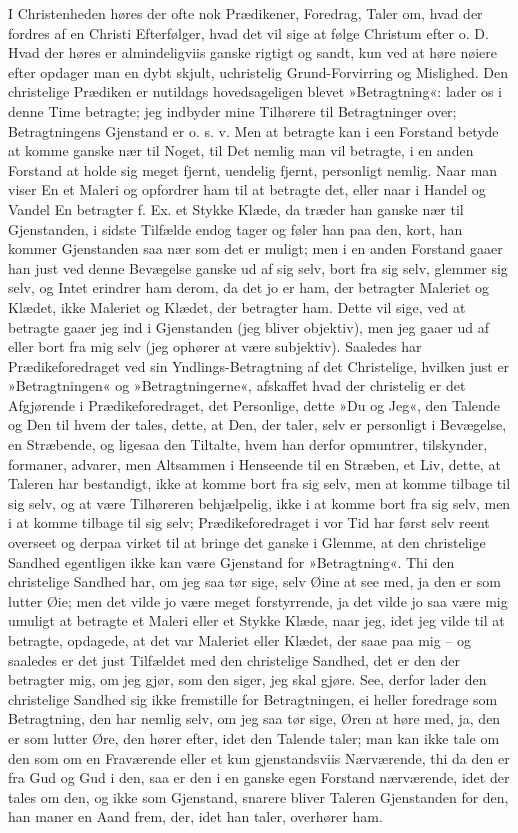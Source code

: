 \documentclass[12pt,a4paper]{article}
\begin{document}
I Christenheden høres der ofte nok Prædikener, Foredrag, Taler om, hvad der fordres af en Christi Efterfølger, hvad det vil sige at følge Christum efter o. D. Hvad der høres er almindeligviis ganske rigtigt og sandt, kun ved at høre nøiere efter opdager man en dybt skjult, uchristelig Grund-Forvirring og Mislighed. Den christelige Prædiken er nutildags hovedsageligen blevet »Betragtning«: lader os i denne Time betragte; jeg indbyder mine Tilhørere til Betragtninger over; Betragtningens Gjenstand er o. s. v. Men at betragte kan i een Forstand betyde at komme ganske nær til Noget, til Det nemlig man vil betragte, i en anden Forstand at holde sig meget fjernt, uendelig fjernt, personligt nemlig. Naar man viser En et Maleri og opfordrer ham til at betragte det, eller naar i Handel og Vandel En betragter f. Ex. et Stykke Klæde, da træder han ganske nær til Gjenstanden, i sidste Tilfælde endog tager og føler han paa den, kort, han kommer Gjenstanden saa nær som det er muligt; men i en anden Forstand gaaer han just ved denne Bevægelse ganske ud af sig selv, bort fra sig selv, glemmer sig selv, og Intet erindrer ham derom, da det jo er ham, der betragter Maleriet og Klædet, ikke Maleriet og Klædet, der betragter ham. Dette vil sige, ved at betragte gaaer jeg ind i Gjenstanden (jeg bliver objektiv), men jeg gaaer ud af eller bort fra mig selv (jeg ophører at være subjektiv). Saaledes har Prædikeforedraget ved sin Yndlings-Betragtning af det Christelige, hvilken just er »Betragtningen« og »Betragtningerne«, afskaffet hvad der christelig er det Afgjørende i Prædikeforedraget, det Personlige, dette »Du og Jeg«, den Talende og Den til hvem der tales, dette, at Den, der taler, selv er personligt i Bevægelse, en Stræbende, og ligesaa den Tiltalte, hvem han derfor opmuntrer, tilskynder, formaner, advarer, men Altsammen i Henseende til en Stræben, et Liv, dette, at Taleren har bestandigt, ikke at komme bort fra sig selv, men at komme tilbage til sig selv, og at være Tilhøreren behjælpelig, ikke i at komme bort fra sig selv, men i at komme tilbage til sig selv; Prædikeforedraget i vor Tid har først selv reent overseet og derpaa virket til at bringe det ganske i Glemme, at den christelige Sandhed egentligen ikke kan være Gjenstand for »Betragtning«. Thi den christelige Sandhed har, om jeg saa tør sige, selv Øine at see med, ja den er som lutter Øie; men det vilde jo være meget forstyrrende, ja det vilde jo saa være mig umuligt at betragte et Maleri eller et Stykke Klæde, naar jeg, idet jeg vilde til at betragte, opdagede, at det var Maleriet eller Klædet, der saae paa mig – og saaledes er det just Tilfældet med den christelige Sandhed, det er den der betragter mig, om jeg gjør, som den siger, jeg skal gjøre. See, derfor lader den christelige Sandhed sig ikke fremstille for Betragtningen, ei heller foredrage som Betragtning, den har nemlig selv, om jeg saa tør sige, Øren at høre med, ja, den er som lutter Øre, den hører efter, idet den Talende taler; man kan ikke tale om den som om en Fraværende eller et kun gjenstandsviis Nærværende, thi da den er fra Gud og Gud i den, saa er den i en ganske egen Forstand nærværende, idet der tales om den, og ikke som Gjenstand, snarere bliver Taleren Gjenstanden for den, han maner en Aand frem, der, idet han taler, overhører ham.
\end{document}
